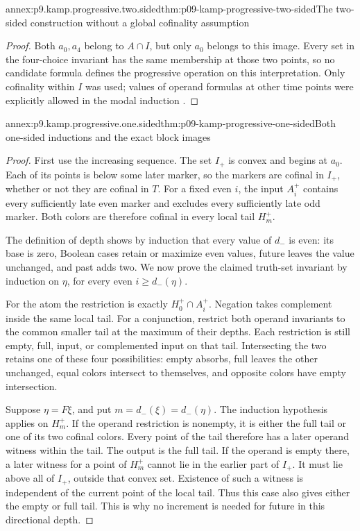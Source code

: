 \begin{annexitem}{annex:p9.kamp.progressive.two.sided}{thm:p09-kamp-progressive-two-sided}{The two-sided construction without a global cofinality assumption}
\begin{proof}
Both \(a_0,a_4\) belong to \(A\cap I\),
but only \(a_0\) belongs to this image. Every
set in the four-choice invariant has the same
membership at those two points, so no candidate
formula defines the progressive operation on
this interpretation. Only cofinality within
\(I\) was used; values of operand formulas
at other time points were explicitly allowed
in the modal induction
\cite[pp.~113--114]{Kamp1968}.
\end{proof}
\end{annexitem}

\begin{annexitem}{annex:p9.kamp.progressive.one.sided}{thm:p09-kamp-progressive-one-sided}{Both one-sided inductions and the exact block images}
\begin{proof}
First use the increasing sequence. The set \(I_+\)
is convex and begins at \(a_0\). Each of its
points is below some later marker, so the
markers are cofinal in \(I_+\), whether
or not they are cofinal in \(T\). For a fixed
even \(i\), the input \(A_i^+\) contains
every sufficiently late even marker and excludes
every sufficiently late odd marker. Both colors
are therefore cofinal in every local tail
\(H_m^+\).

The definition of depth shows by induction that
every value of \(d_-\) is even: its base is
zero, Boolean cases retain or maximize even
values, future leaves the value unchanged,
and past adds two. We now prove the claimed
truth-set invariant by induction on \(\eta\),
for every even \(i\geq d_-(\eta)\).

For the atom the restriction is exactly
\(H_0^+\cap A_i^+\). Negation takes complement
inside the same local tail. For a conjunction,
restrict both operand invariants to the common
smaller tail at the maximum of their depths.
Each restriction is still empty, full, input,
or complemented input on that tail. Intersecting
the two retains one of these four possibilities:
empty absorbs, full leaves the other unchanged,
equal colors intersect to themselves, and
opposite colors have empty intersection.

Suppose \(\eta=F\xi\), and put
\(m=d_-(\xi)=d_-(\eta)\). The induction
hypothesis applies on \(H_m^+\). If the
operand restriction is nonempty, it is either
the full tail or one of its two cofinal colors.
Every point of the tail therefore has a later
operand witness within the tail. The output
is the full tail. If the operand is empty
there, a later witness for a point of
\(H_m^+\) cannot lie in the earlier part
of \(I_+\). It must lie above all of
\(I_+\), outside that convex set. Existence
of such a witness is independent of the
current point of the local tail. Thus this
case also gives either the empty or full tail.
This is why no increment is needed for future
in this directional depth.


\end{proof}
\end{annexitem}
